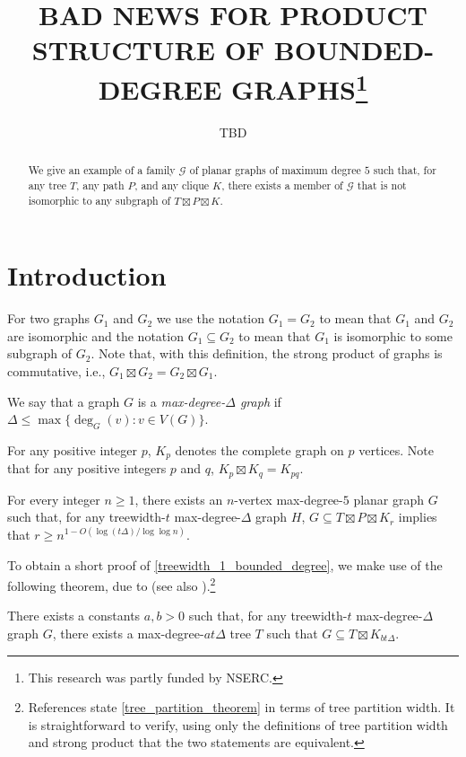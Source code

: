 \documentclass{patmorin}
\title{\MakeUppercase{Bad News for Product Structure of Bounded-Degree Graphs}\thanks{This research was partly funded by NSERC.}}
\author{TBD}
\date{}
\begin{document}
\maketitle
\renewcommand{\E}{\mathbb{E}}
\renewcommand{\Pr}{\mathbb{P}}

\begin{abstract}
  We give an example of a family $\mathcal{G}$ of planar graphs of maximum degree $5$ such that, for any tree $T$, any path $P$, and any clique $K$, there exists a member of $\mathcal{G}$ that is not isomorphic to any subgraph of $T\boxtimes P\boxtimes K$.
\end{abstract}

\section{Introduction}

For two graphs $G_1$ and $G_2$ we use the notation $G_1=G_2$ to mean that $G_1$ and $G_2$ are isomorphic and the notation $G_1\subseteq G_2$ to mean that $G_1$ is isomorphic to some subgraph of $G_2$.  Note that, with this definition, the strong product of graphs is commutative, i.e., $G_1\boxtimes G_2=G_2\boxtimes G_1$.

We say that a graph $G$ is a \emph{max-degree-$\Delta$ graph} if $\Delta \le \max\{\deg_G(v):v\in V(G)\}$.

For any positive integer $p$, $K_p$ denotes the complete graph on $p$ vertices.  Note that for any positive integers $p$ and $q$, $K_{p}\boxtimes K_{q}=K_{pq}$.

\begin{thm}\label{treewidth_1_bounded_degree}
  For every integer $n\ge 1$, there exists an $n$-vertex max-degree-$5$ planar graph $G$ such that, for any treewidth-$t$ max-degree-$\Delta$ graph $H$, $G\subseteq T\boxtimes P\boxtimes K_r$ implies that $r\ge n^{1-O(\log (t\Delta)/\log\log n)}$.
\end{thm}

To obtain a short proof of \cref{treewidth_1_bounded_degree}, we make use of the following theorem, due to \citet{ding.oporowski:some} (see also \citet{wood:on}).\footnote{References \cite{ding.oporowski:some,wood:on} state \cref{tree_partition_theorem} in terms of tree partition width. It is straightforward to verify, using only the definitions of tree partition width and strong product that the two statements are equivalent.}

\begin{thm}\label{tree_partition_theorem}
  There exists a constants $a,b>0$ such that, for any treewidth-$t$ max-degree-$\Delta$ graph $G$, there exists a max-degree-$at\Delta$ tree $T$ such that $G\subseteq T\boxtimes K_{bt\Delta}$.
\end{thm}
\end{document}

